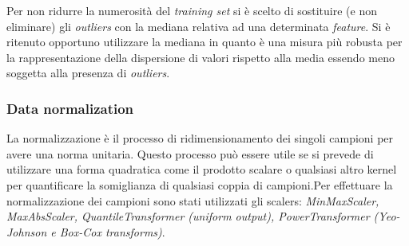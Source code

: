                         Per non ridurre la numerosità del \textit{training set} si è scelto di sostituire (e non eliminare) gli \textit{outliers} con la mediana relativa ad una determinata \textit{feature}. Si è ritenuto opportuno utilizzare la mediana in quanto è una misura più robusta per la rappresentazione della dispersione di valori rispetto alla media essendo meno soggetta alla presenza di \textit{outliers}.                        
                
                \subsubsection{Data normalization}
                
                La normalizzazione è il processo di ridimensionamento dei singoli campioni per avere una norma unitaria. Questo processo può essere utile se si prevede di utilizzare una forma quadratica come il prodotto scalare o qualsiasi altro kernel per quantificare la somiglianza di qualsiasi coppia di campioni.Per effettuare la normalizzazione dei campioni sono stati utilizzati gli scalers: \textit{MinMaxScaler, MaxAbsScaler, QuantileTransformer (uniform output), PowerTransformer (Yeo-Johnson e Box-Cox transforms)}.
                
